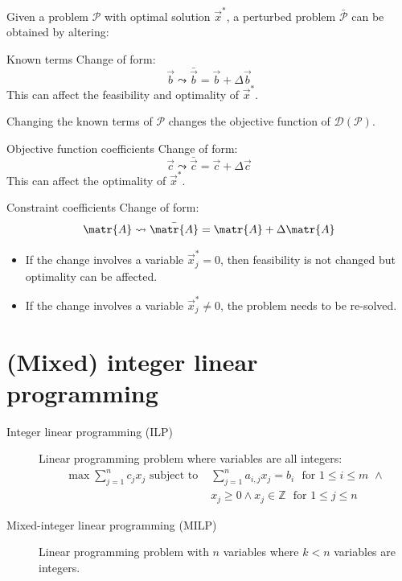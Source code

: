 Given a problem $\mathcal{P}$ with optimal solution $\vec{x}^*$, a perturbed problem $\bar{\mathcal{P}}$ can be obtained by altering:
\begin{descriptionlist}
    \item[Known terms] 
        Change of form: 
        \[ \vec{b} \leadsto \bar{\vec{b}} = \vec{b} + \Delta \vec{b} \]
        This can affect the feasibility and optimality of $\vec{x}^*$.

        \begin{remark}
            Changing the known terms of $\mathcal{P}$ changes the objective function of $\mathcal{D}(\mathcal{P})$.
        \end{remark}

    \item[Objective function coefficients] 
        Change of form: 
        \[ \vec{c} \leadsto \bar{\vec{c}} = \vec{c} + \Delta \vec{c} \]
        This can affect the optimality of $\vec{x}^*$.
    
    \item[Constraint coefficients] 
        Change of form: 
        \[ \matr{A} \leadsto \bar{\matr{A}} = \matr{A} + \Delta \matr{A} \]
        \begin{itemize}
            \item If the change involves a variable $\vec{x}^*_j = 0$, then feasibility is not changed but optimality can be affected.
            \item If the change involves a variable $\vec{x}^*_j \neq 0$, the problem needs to be re-solved.
        \end{itemize}
\end{descriptionlist}



\section{(Mixed) integer linear programming}

\begin{description}
    \item[Integer linear programming (ILP)] 
        Linear programming problem where variables are all integers:
        \[ 
            \begin{split}
                \max \sum_{j=1}^{n} c_j x_j \text{ subject to } &\sum_{j=1}^{n} a_{i,j} x_j = b_i \,\,\text{ for } 1 \leq i \leq m \,\,\land \\
                    & x_j \geq 0 \land x_j \in \mathbb{Z} \,\,\text{ for } 1 \leq j \leq n
            \end{split}
        \]

    \item[Mixed-integer linear programming (MILP)] 
        Linear programming problem with $n$ variables where $k < n$ variables are integers.
\end{description}


